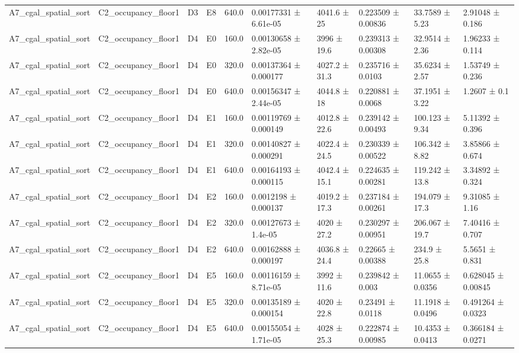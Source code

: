 \begin{table}
\begin{tabular}{llllllllll}
A7\_cgal\_spatial\_sort & C2\_occupancy\_floor1 & D3 & E8 & 640.0 & 0.00177331 ± 6.61e-05 & 4041.6 ± 25 & 0.223509 ± 0.00836 & 33.7589 ± 5.23 & 2.91048 ± 0.186 \\
A7\_cgal\_spatial\_sort & C2\_occupancy\_floor1 & D4 & E0 & 160.0 & 0.00130658 ± 2.82e-05 & 3996 ± 19.6 & 0.239313 ± 0.00308 & 32.9514 ± 2.36 & 1.96233 ± 0.114 \\
A7\_cgal\_spatial\_sort & C2\_occupancy\_floor1 & D4 & E0 & 320.0 & 0.00137364 ± 0.000177 & 4027.2 ± 31.3 & 0.235716 ± 0.0103 & 35.6234 ± 2.57 & 1.53749 ± 0.236 \\
A7\_cgal\_spatial\_sort & C2\_occupancy\_floor1 & D4 & E0 & 640.0 & 0.00156347 ± 2.44e-05 & 4044.8 ± 18 & 0.220881 ± 0.0068 & 37.1951 ± 3.22 & 1.2607 ± 0.1 \\
A7\_cgal\_spatial\_sort & C2\_occupancy\_floor1 & D4 & E1 & 160.0 & 0.00119769 ± 0.000149 & 4012.8 ± 22.6 & 0.239142 ± 0.00493 & 100.123 ± 9.34 & 5.11392 ± 0.396 \\
A7\_cgal\_spatial\_sort & C2\_occupancy\_floor1 & D4 & E1 & 320.0 & 0.00140827 ± 0.000291 & 4022.4 ± 24.5 & 0.230339 ± 0.00522 & 106.342 ± 8.82 & 3.85866 ± 0.674 \\
A7\_cgal\_spatial\_sort & C2\_occupancy\_floor1 & D4 & E1 & 640.0 & 0.00164193 ± 0.000115 & 4042.4 ± 15.1 & 0.224635 ± 0.00281 & 119.242 ± 13.8 & 3.34892 ± 0.324 \\
A7\_cgal\_spatial\_sort & C2\_occupancy\_floor1 & D4 & E2 & 160.0 & 0.0012198 ± 0.000137 & 4019.2 ± 17.3 & 0.237184 ± 0.00261 & 194.079 ± 17.3 & 9.31085 ± 1.16 \\
A7\_cgal\_spatial\_sort & C2\_occupancy\_floor1 & D4 & E2 & 320.0 & 0.00127673 ± 1.4e-05 & 4020 ± 27.2 & 0.230297 ± 0.00951 & 206.067 ± 19.7 & 7.40416 ± 0.707 \\
A7\_cgal\_spatial\_sort & C2\_occupancy\_floor1 & D4 & E2 & 640.0 & 0.00162888 ± 0.000197 & 4036.8 ± 24.4 & 0.22665 ± 0.00388 & 234.9 ± 25.8 & 5.5651 ± 0.831 \\
A7\_cgal\_spatial\_sort & C2\_occupancy\_floor1 & D4 & E5 & 160.0 & 0.00116159 ± 8.71e-05 & 3992 ± 11.6 & 0.239842 ± 0.003 & 11.0655 ± 0.0356 & 0.628045 ± 0.00845 \\
A7\_cgal\_spatial\_sort & C2\_occupancy\_floor1 & D4 & E5 & 320.0 & 0.00135189 ± 0.000154 & 4020 ± 22.8 & 0.23491 ± 0.0118 & 11.1918 ± 0.0496 & 0.491264 ± 0.0323 \\
A7\_cgal\_spatial\_sort & C2\_occupancy\_floor1 & D4 & E5 & 640.0 & 0.00155054 ± 1.71e-05 & 4028 ± 25.3 & 0.222874 ± 0.00985 & 10.4353 ± 0.0413 & 0.366184 ± 0.0271 \\

\end{tabular}
\end{table}
